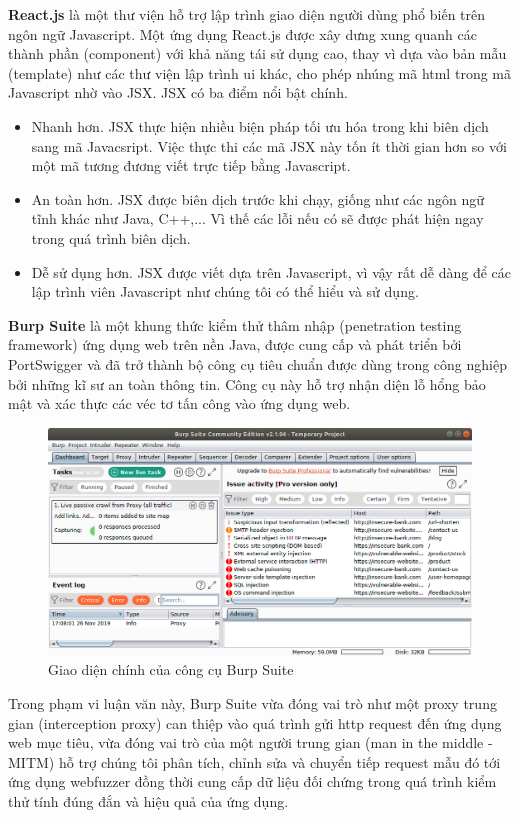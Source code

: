\textbf{React.js} là một thư viện hỗ trợ lập trình giao diện người dùng phổ biến trên ngôn ngữ Javascript. Một ứng dụng React.js được xây dưng xung quanh các thành phần (component) với khả năng tái sử dụng cao, thay vì dựa vào bản mẫu (template) như các thư viện lập trình \acrshort{ui} khác, cho phép nhúng mã \acrshort{html} trong mã Javascript nhờ vào JSX. JSX có ba điểm nổi bật chính.
\begin{itemize}
    \item Nhanh hơn. JSX thực hiện nhiều biện pháp tối ưu hóa trong khi biên dịch sang mã Javacsript. Việc thực thi các mã JSX này tốn ít thời gian hơn so với một mã tương đương viết trực tiếp bằng Javascript.
    \item An toàn hơn. JSX được biên dịch trước khi chạy, giống như các ngôn ngữ tĩnh khác như Java, C++,... Vì thế các lỗi nếu có sẽ được phát hiện ngay trong quá trình biên dịch.
    \item Dễ sử dụng hơn. JSX được viết dựa trên Javascript, vì vậy rất dễ dàng để các lập trình viên Javascript như chúng tôi có thể hiểu và sử dụng.
\end{itemize}
\textbf{Burp Suite} \parencite{burpsuite} là một khung thức kiểm thử thâm nhập (penetration testing framework) ứng dụng web trên nền Java, được cung cấp và phát triển bởi PortSwigger và đã trở thành bộ công cụ tiêu chuẩn được dùng trong công nghiệp bởi những kĩ sư an toàn thông tin. Công cụ này hỗ trợ nhận diện lỗ hổng bảo mật và xác thực các véc tơ tấn công vào ứng dụng web.
\begin{figure}[H]
  \centering
    \includegraphics[width=\textwidth,keepaspectratio=true]{images/burp-suite-usage.png}
  \caption{Giao diện chính của công cụ Burp Suite}
  \label{fig:burp-suite-usage}
\end{figure}
Trong phạm vi luận văn này, Burp Suite vừa đóng vai trò như một proxy trung gian (interception proxy) can thiệp vào quá trình gửi \acrshort{http} request đến ứng dụng web mục tiêu, vừa đóng vai trò của một người trung gian (man in the middle - MITM) hỗ trợ chúng tôi phân tích, chỉnh sửa và chuyển tiếp request mẫu đó tới ứng dụng webfuzzer đồng thời cung cấp dữ liệu đối chứng trong quá trình kiểm thử tính đúng đắn và hiệu quả của ứng dụng.\par

